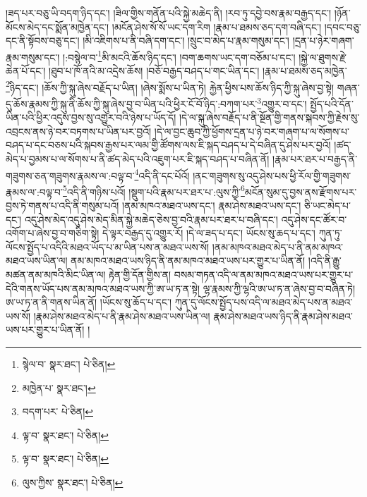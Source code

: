 །ཟད་པར་བཅུ་ཡི་བདག་ཉིད་དང་། །ཟིལ་གྱིས་གནོན་པའི་སྐྱེ་མཆེད་ནི། །རབ་ཏུ་དབྱེ་བས་རྣམ་བརྒྱད་དང་། །ཉོན་མོངས་མེད་དང་སྨོན་མཁྱེན་དང་། །མངོན་ཤེས་སོ་སོ་ཡང་དག་རིག །རྣམ་པ་ཐམས་ཅད་དག་བཞི་དང་། །དབང་བཅུ་དང་ནི་སྟོབས་བཅུ་དང་། །མི་འཇིགས་པ་ནི་བཞི་དག་དང་། །སྲུང་བ་མེད་པ་རྣམ་གསུམ་དང་། །དྲན་པ་ཉེར་གཞག་རྣམ་གསུམ་དང་། །:བསྙེལ་བ་\footnote{སྙེལ་བ་  སྣར་ཐང་།  པེ་ཅིན། }མི་མངའི་ཆོས་ཉིད་དང་། །བག་ཆགས་ཡང་དག་བཅོམ་པ་དང་། །སྐྱེ་ལ་ཐུགས་རྗེ་ཆེན་པོ་དང་། །ཐུབ་པ་ཁོ་ནའི་མ་འདྲེས་ཆོས། །བཅོ་བརྒྱད་བཤད་པ་གང་ཡིན་དང་། །རྣམ་པ་ཐམས་ཅད་མཁྱེན་\footnote{མཁྱེན་པ་  སྣར་ཐང་། }ཉིད་དང་། །ཆོས་ཀྱི་སྐུ་ཞེས་བརྗོད་པ་ཡིན། །ཞེས་སྨོས་པ་ཡིན་ཏེ། རྐྱེན་ཕྱིས་པས་ཆོས་ཉིད་ཀྱི་སྐུ་ཞེས་བྱ་སྟེ། གཞན་དུ་ཆོས་རྣམས་ཀྱི་སྐུ་ནི་ཆོས་ཀྱི་སྐུ་ཞེས་བྱ་བ་ཡིན་པའི་ཕྱིར་ངོ་བོ་ཉིད་:བཀག་པར་\footnote{བདག་པར་  པེ་ཅིན། }འགྱུར་བ་དང་། སྤྱོད་པའི་དོན་ཡིན་པའི་ཕྱིར་འདུས་བྱས་སུ་འགྱུར་བའི་ཉེས་པ་ཡོད་དོ། །དེ་ལ་སྐུ་ཞེས་བརྗོད་པ་ནི་སྔོན་གྱི་གནས་སྐབས་ཀྱི་རྗེས་སུ་འབྲངས་ནས་ཉེ་བར་བཏགས་པ་ཡིན་པར་བྱའོ། །དེ་ལ་བྱང་ཆུབ་ཀྱི་ཕྱོགས་དྲན་པ་ཉེ་བར་གཞག་པ་ལ་སོགས་པ་བཤད་པ་དང་བཅས་པའི་སྐབས་རྒྱས་པར་ལམ་གྱི་ཚོགས་ལས་ཇི་སྐད་བཤད་པ་དེ་བཞིན་དུ་ཤེས་པར་བྱའོ། །ཚད་མེད་པ་བྱམས་པ་ལ་སོགས་པ་ནི་ཚད་མེད་པའི་འཇུག་པར་ཇི་སྐད་བཤད་པ་བཞིན་ནོ། །རྣམ་པར་ཐར་པ་བརྒྱད་ནི་གཟུགས་ཅན་གཟུགས་རྣམས་ལ་:བལྟ་བ་\footnote{ལྟ་བ་  སྣར་ཐང་།  པེ་ཅིན། }འདི་ནི་དང་པོའོ། །ནང་གཟུགས་སུ་འདུ་ཤེས་པས་ཕྱི་རོལ་གྱི་གཟུགས་རྣམས་ལ་:བལྟ་བ་\footnote{ལྟ་བ་  སྣར་ཐང་།  པེ་ཅིན། }འདི་ནི་གཉིས་པའོ། །སྡུག་པའི་རྣམ་པར་ཐར་པ་:ལུས་ཀྱི་\footnote{ལུས་ཀྱིས་  སྣར་ཐང་།  པེ་ཅིན། }མངོན་སུམ་དུ་བྱས་ནས་རྫོགས་པར་བྱས་ཏེ་གནས་པ་འདི་ནི་གསུམ་པའོ། །ནམ་མཁའ་མཐའ་ཡས་དང་། རྣམ་ཤེས་མཐའ་ཡས་དང་། ཅི་ཡང་མེད་པ་དང་། འདུ་ཤེས་མེད་འདུ་ཤེས་མེད་མིན་སྐྱེ་མཆེད་ཅེས་བྱ་བའི་རྣམ་པར་ཐར་པ་བཞི་དང་། འདུ་ཤེས་དང་ཚོར་བ་འགོག་པ་ཞེས་བྱ་བ་གཅིག་སྟེ། དེ་ལྟར་བརྒྱད་དུ་འགྱུར་རོ། །དེ་ལ་ཟད་པ་དང་། ཡོངས་སུ་ཆད་པ་དང་། ཀུན་ཏུ་ལོངས་སྤྱོད་པ་འདིའི་མཐའ་ཡོད་པ་མ་ཡིན་པས་ན་མཐའ་ཡས་སོ། །ནམ་མཁའ་མཐའ་མེད་པ་ནི་ནམ་མཁའ་མཐའ་ཡས་ཡིན་ལ། ནམ་མཁའ་མཐའ་ཡས་ཉིད་ནི་ནམ་མཁའ་མཐའ་ཡས་པར་གྱུར་པ་ཡིན་ནོ། །འདི་ནི་རྒྱུ་མཚན་ནམ་མཁའི་མིང་ཡིན་ལ། རྟེན་གྱི་དོན་གྱིས་ན། བསམ་གཏན་འདི་ལ་ནམ་མཁའ་མཐའ་ཡས་པར་གྱུར་པ་དེའི་གནས་ཡོད་པས་ནམ་མཁའ་མཐའ་ཡས་ཀྱི་ཨ་ཡ་ཏ་ན་སྟེ། ལྷ་རྣམས་ཀྱི་ལྷའི་ཨ་ཡ་ཏ་ན་ཞེས་བྱ་བ་བཞིན་ཏེ། ཨ་ཡ་ཏ་ན་ནི་གནས་ཡིན་ནོ། །ཡོངས་སུ་ཆོད་པ་དང་། ཀུན་དུ་ལོངས་སྤྱོད་པས་འདི་ལ་མཐའ་མེད་པས་ན་མཐའ་ཡས་སོ། །རྣམ་ཤེས་མཐའ་མེད་པ་ནི་རྣམ་ཤེས་མཐའ་ཡས་ཡིན་ལ། རྣམ་ཤེས་མཐའ་ཡས་ཉིད་ནི་རྣམ་ཤེས་མཐའ་ཡས་པར་གྱུར་པ་ཡིན་ནོ། །
